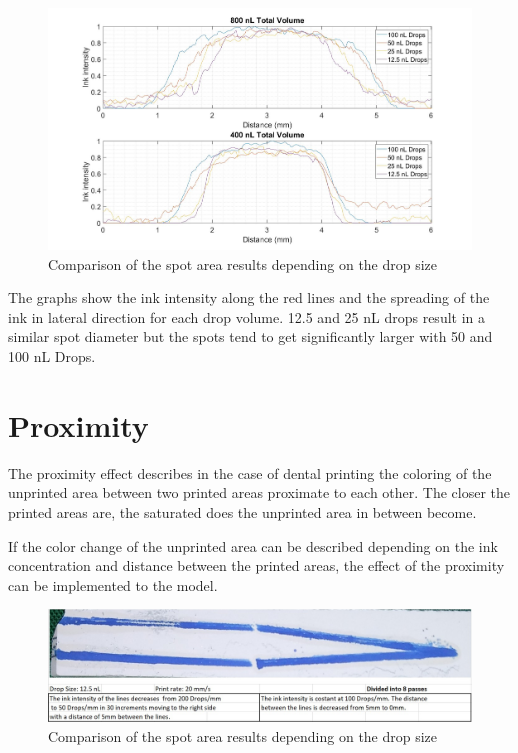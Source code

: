 \begin{figure}[H]
	\centering
	\includegraphics[width=1\textwidth]{grafiken/SpotArea.jpg}
	\caption{Comparison of the spot area results depending on the drop size}
	\label{fig:SpotArea}
\end{figure} 

\bigskip

The graphs show the ink intensity along the red lines and the spreading of the ink in lateral direction for each drop volume. 12.5 and 25 nL drops result in a similar spot diameter but the spots tend to get significantly larger with 50 and 100 nL Drops.

\section{Proximity}
The proximity effect describes in the case of dental printing the coloring of the unprinted area between two printed areas proximate to each other. The closer the printed areas are, the saturated does the unprinted area in between become.

If the color change of the unprinted area can be described depending on the ink concentration and distance between the printed areas, the effect of the proximity can be implemented to the model.
\bigskip

\begin{figure}[H]
	\centering
	\includegraphics[width=1\textwidth]{grafiken/proximityprint.jpg}
	\caption{Comparison of the spot area results depending on the drop size}
	\label{fig:proximityprint}
\end{figure} 

